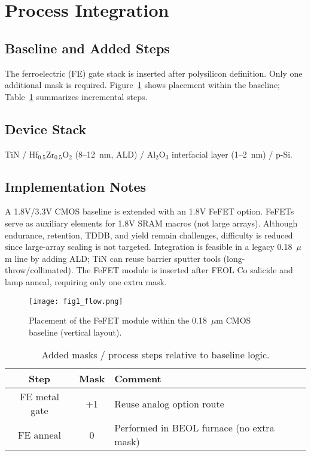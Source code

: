 \documentclass[conference]{IEEEtran}
\begin{document}
\section{Process Integration}
\subsection{Baseline and Added Steps}
The ferroelectric (FE) gate stack is inserted after polysilicon definition. Only one additional mask is required. Figure~\ref{fig:flow} shows placement within the baseline; Table~\ref{tab:masks} summarizes incremental steps.

\subsection{Device Stack}
TiN / Hf$_{0.5}$Zr$_{0.5}$O$_2$ (8–12~nm, ALD) / Al$_2$O$_3$ interfacial layer (1–2~nm) / p-Si.

\subsection{Implementation Notes}
A 1.8V/3.3V CMOS baseline is extended with an 1.8V FeFET option. FeFETs serve as auxiliary elements for 1.8V SRAM macros (not large arrays). Although endurance, retention, TDDB, and yield remain challenges, difficulty is reduced since large-array scaling is not targeted. Integration is feasible in a legacy 0.18~$\mu$m line by adding ALD; TiN can reuse barrier sputter tools (long-throw/collimated). The FeFET module is inserted after FEOL Co salicide and lamp anneal, requiring only one extra mask.

\begin{figure}[H]
\centering
\texttt{[image: fig1\_flow.png]}
\caption{Placement of the FeFET module within the 0.18~$\mu$m CMOS baseline (vertical layout).}
\label{fig:flow}
\end{figure}

\begin{table}[H]
\centering
\caption{Added masks / process steps relative to baseline logic.}
\label{tab:masks}
\begin{tabular}{|c|c|l|}
\hline
Step & Mask & Comment \\
\hline
FE metal gate & +1 & Reuse analog option route \\
FE anneal & 0 & Performed in BEOL furnace (no extra mask) \\
\hline
\end{tabular}
\end{table}
\end{document}
